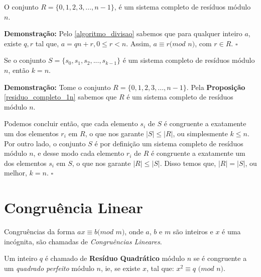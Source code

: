 \begin{proposition}\label{residuo_completo_1n}
O conjunto $R = \{0, 1, 2, 3,...,n-1\}$, é um sistema completo de resíduos módulo $n$.
\end{proposition}
\textbf{Demonstração:}
Pelo \autoref{algoritmo_divisao} sabemos que para qualquer inteiro $a$, existe $q, r$ tal que, $a = qn + r, 0 \leq r < n$. Assim, $a\equiv r(mod$ $n)$, com $r \in R$. $\square$
\\

\begin{theorem}
Se o conjunto $S = \{s_0, s_1, s_2, ..., s_{k-1}\}$ é um sistema completo de resíduos módulo $n$, então $k=n$.
\end{theorem}
\textbf{Demonstração:}
Tome o conjunto $R = \{0, 1, 2, 3,...,n-1\}$. Pela \textbf{Proposição} \autoref{residuo_completo_1n} sabemos que $R$ é um sistema completo de resíduos módulo $n$.

Podemos concluir então, que cada elemento $s_i$ de $S$ é congruente a exatamente um dos elementos $r_i$ em $R$, o que nos garante $|S| \leq |R|$, ou simplesmente $k\leq n$. 
Por outro lado, o conjunto $S$ é por definição um sistema completo de resíduos módulo $n$, e desse modo cada elemento $r_i$ de $R$ é congruente a exatamente um dos elementos $s_i$ em $S$, o que nos garante $|R| \leq |S|$.
Disso temos que, $|R| = |S|$, ou melhor, $k=n$. $\square$
\\




\section{Congruência Linear}

\begin{definition}
Congruências da forma $ax \equiv b (mod$ $m)$, onde $a$, $b$ e $m$ são inteiros e $x$ é uma incógnita, são chamadas de \textit{Congruências Lineares}.
\newline
\end{definition}


\begin{definition}\label{def_residuo_quadratico}
Um inteiro $q$ é chamado de \textbf{Resíduo Quadrático} módulo $n$ se é congruente a um \textit{quadrado perfeito} módulo $n$, ie, se existe $x$, tal que:
$x^2 \equiv q$ $(mod$ $n)$. 
\newline 
\end{definition}

